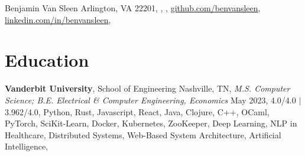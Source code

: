 \documentclass[10.5pt]{article}
\newcommand{\postlinebreakspacing} {
  \vspace{0.7ex}
}
\begin{document}

\resumeheader
{Benjamin Van Sleen}
{
	{Arlington, VA 22201},
	\PHONE,
	\href{mailto:\EMAIL}{\EMAIL},
	\href{https://github.com/benvansleen}{github.com/benvansleen},
	\href{https://linkedin.com/in/benvansleen}{linkedin.com/in/benvansleen},
}

\section*{Education}
\postlinebreakspacing
\lines
{
	{\textbf{Vanderbit University}, School of Engineering \hfill Nashville, TN},
	\hspace*{1em}\textit{M.S. Computer Science; B.E. Electrical \& Computer Engineering, Economics} \hfill May 2023,
	 {4.0/4.0} $\mid$  {3.962/4.0},
	 {Python, Rust, Javascript, React, Java, Clojure, C++, OCaml, PyTorch, SciKit-Learn, Docker, Kubernetes, ZooKeeper},
	 {Deep Learning, NLP in Healthcare, Distributed Systems, Web-Based System Architecture, Artificial Intelligence},
}
\end{document}
